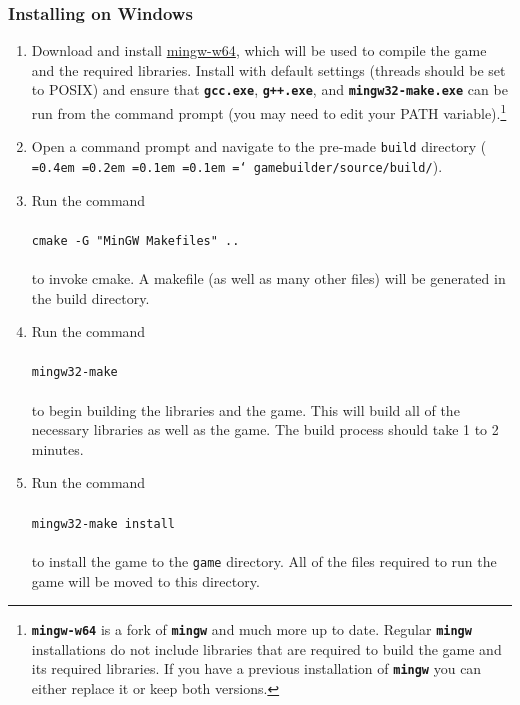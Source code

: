 \documentclass[12pt, titlepage]{article}
\newcommand*\justify{%
  \fontdimen2\font=0.4em%
  \fontdimen3\font=0.2em%
  \fontdimen4\font=0.1em%
  \fontdimen7\font=0.1em%
  \hyphenchar\font=`\-%
}
\begin{document}
\subsubsection{Installing on Windows}
\begin{enumerate}
  \item Download and install \href{http://sourceforge.net/projects/mingw-w64/}{mingw-w64}, which will be used to compile the game and the required libraries.  Install with default settings (threads should be set to POSIX) and ensure that \texttt{\bf gcc.exe}, \texttt{\bf g++.exe}, and \texttt{\bf mingw32-make.exe} can be run from the command prompt (you may need to edit your PATH variable).\footnote{\texttt{\bf mingw-w64} is a fork of \texttt{\bf mingw} and much more up to date.  Regular \texttt{\bf mingw} installations do not include libraries that are required to build the game and its required libraries.  If you have a previous installation of \texttt{\bf mingw} you can either replace it or keep both versions.}

  \item Open a command prompt and navigate to the pre-made \texttt{build} directory (\texttt{\justify gamebuilder/source/build/}).
  \item Run the command\\\\
   ${}$\qquad \texttt{cmake -G "MinGW Makefiles" ..}\\\\
    to invoke cmake.  A makefile (as well as many other files) will be generated in the build directory.

  \item Run the command\\\\
   ${}$\qquad \texttt{mingw32-make}\\\\
    to begin building the libraries and the game.  This will build all of the necessary libraries as well as the game.  The build process should take 1 to 2 minutes.

  \item Run the command\\\\
  ${}$\qquad \texttt{mingw32-make install}\\\\
  to install the game to the \texttt{game} directory.  All of the files required to run the game will be moved to this directory.

\end{enumerate}
\end{document}
